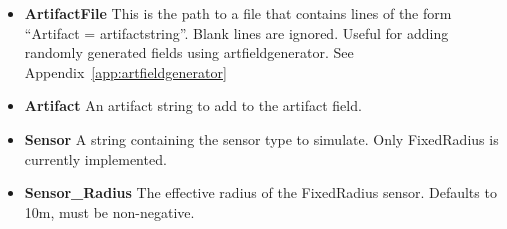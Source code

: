 \begin{itemize}
\item {\bf ArtifactFile} This is the path to a file that contains lines of the form ``Artifact = artifactstring''.  Blank lines are ignored.  Useful for adding randomly generated fields using artfieldgenerator.  See Appendix~\ref{app:artfieldgenerator}
\item {\bf Artifact} An artifact string to add to the artifact field.
\item {\bf Sensor} A string containing the sensor type to simulate.  Only FixedRadius is currently implemented.
\item {\bf Sensor\_Radius} The effective radius of the FixedRadius sensor.  Defaults to 10m, must be non-negative.
\end{itemize}
